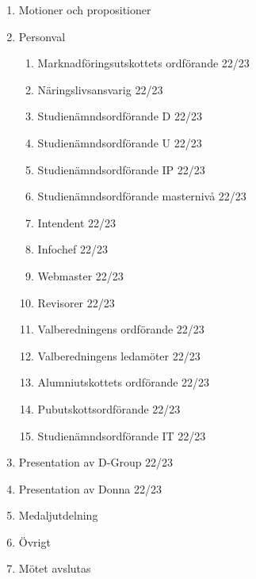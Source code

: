 \documentclass{datateknologsektionen-document}
\begin{document}
\begin{enumerate}[topsep=0pt,itemsep=1ex]
  \item Motioner och propositioner
  \item Personval
        \begin{enumerate}[label*=\arabic*.,leftmargin=3em]
          \item Marknadföringsutskottets ordförande 22/23
          \item Näringslivsansvarig 22/23
          \item Studienämndsordförande D 22/23
          \item Studienämndsordförande U 22/23
          \item Studienämndsordförande IP 22/23
          \item Studienämndsordförande masternivå 22/23
          \item Intendent 22/23
          \item Infochef 22/23
          \item Webmaster 22/23
          \item Revisorer 22/23
          \item Valberedningens ordförande 22/23
          \item Valberedningens ledamöter 22/23
          \item Alumniutskottets ordförande 22/23
          \item Pubutskottsordförande 22/23
          \item Studienämndsordförande IT 22/23
        \end{enumerate}
  \item Presentation av D-Group 22/23
  \item Presentation av Donna 22/23
  \item Medaljutdelning
  \item Övrigt
  \item Mötet avslutas
\end{enumerate}
\end{document}
